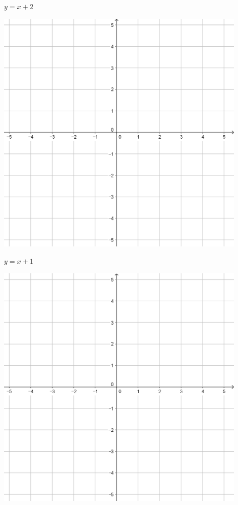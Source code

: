 \documentclass[a4paper]{oblivoir}
\begin{document}
\clearpage
\begin{minipage}{0.45\textwidth}\centering
\(y=x+2\)
\par\bigskip\includegraphics[width=0.9\textwidth]{55}
\end{minipage}
\begin{minipage}{0.45\textwidth}\centering
\(y=x+1\)
\par\bigskip\includegraphics[width=0.9\textwidth]{55}
\end{minipage}\bigskip\bigskip\par
\end{document}
